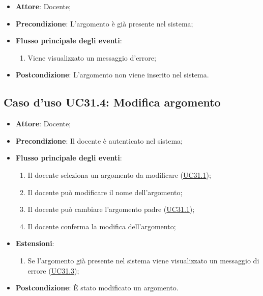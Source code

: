 \documentclass[12pt,a4paper]{article}
\begin{document}
\begin{itemize}

\item \textbf{Attore}: Docente; 
\item \textbf{Precondizione}: L'argomento è già presente nel sistema;

\item \textbf{Flusso principale degli eventi}:
\begin{enumerate}
	\item Viene visualizzato un messaggio d'errore;
	
\end{enumerate}
\item \textbf{Postcondizione}: L'argomento non viene inserito nel sistema.
\end{itemize}
\hypertarget{UC31.4}{}
\subsection{Caso d'uso UC31.4: Modifica argomento}

\begin{itemize}

\item \textbf{Attore}: Docente; 
\item \textbf{Precondizione}: Il docente è autenticato nel sistema;

\item \textbf{Flusso principale degli eventi}:
\begin{enumerate}
	\item Il docente seleziona un argomento da modificare (\hyperlink{UC31.1}{UC31.1});
	\item Il docente può modificare il nome dell'argomento;
	\item Il docente può cambiare l'argomento padre (\hyperlink{UC31.1}{UC31.1});
	\item Il docente conferma la modifica dell'argomento;
	
\end{enumerate}
\item \textbf{Estensioni}:
\begin{enumerate}
	\item Se l'argomento già presente nel sistema viene visualizzato un messaggio di errore (\hyperlink{UC31.3}{UC31.3});
	
\end{enumerate}
\item \textbf{Postcondizione}: È stato modificato un argomento.
\end{itemize}
\hypertarget{UC31.5}{}
\end{document}
